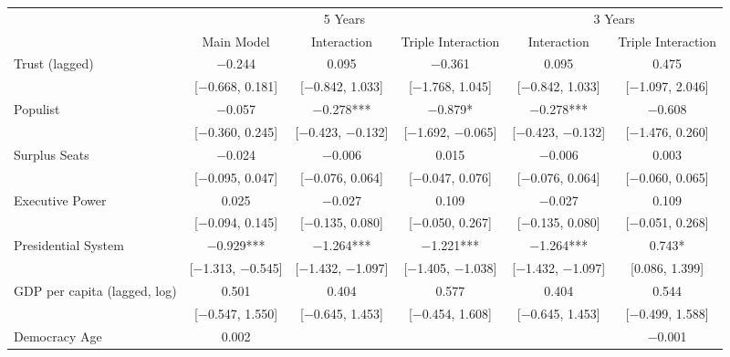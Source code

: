 \begin{table}
\centering\centering\centering
\begin{tabular}[t]{lccccc}
\toprule
\multicolumn{1}{c}{ } & \multicolumn{3}{c}{5 Years} & \multicolumn{2}{c}{3 Years} \\
\cmidrule(l{3pt}r{3pt}){2-4} \cmidrule(l{3pt}r{3pt}){5-6}
  & Main Model & Interaction & Triple Interaction & Interaction  & Triple Interaction \\
\midrule
Trust (lagged) & \num{-0.244} & \num{0.095} & \num{-0.361} & \num{0.095} & \num{0.475}\\
 & {}[\num{-0.668}, \num{0.181}] & {}[\num{-0.842}, \num{1.033}] & {}[\num{-1.768}, \num{1.045}] & {}[\num{-0.842}, \num{1.033}] & {}[\num{-1.097}, \num{2.046}]\\
Populist & \num{-0.057} & \num{-0.278}*** & \num{-0.879}* & \num{-0.278}*** & \num{-0.608}\\
 & {}[\num{-0.360}, \num{0.245}] & {}[\num{-0.423}, \num{-0.132}] & {}[\num{-1.692}, \num{-0.065}] & {}[\num{-0.423}, \num{-0.132}] & {}[\num{-1.476}, \num{0.260}]\\
Surplus Seats & \num{-0.024} & \num{-0.006} & \num{0.015} & \num{-0.006} & \num{0.003}\\
 & {}[\num{-0.095}, \num{0.047}] & {}[\num{-0.076}, \num{0.064}] & {}[\num{-0.047}, \num{0.076}] & {}[\num{-0.076}, \num{0.064}] & {}[\num{-0.060}, \num{0.065}]\\
Executive Power & \num{0.025} & \num{-0.027} & \num{0.109} & \num{-0.027} & \num{0.109}\\
 & {}[\num{-0.094}, \num{0.145}] & {}[\num{-0.135}, \num{0.080}] & {}[\num{-0.050}, \num{0.267}] & {}[\num{-0.135}, \num{0.080}] & {}[\num{-0.051}, \num{0.268}]\\
Presidential System & \num{-0.929}*** & \num{-1.264}*** & \num{-1.221}*** & \num{-1.264}*** & \num{0.743}*\\
 & {}[\num{-1.313}, \num{-0.545}] & {}[\num{-1.432}, \num{-1.097}] & {}[\num{-1.405}, \num{-1.038}] & {}[\num{-1.432}, \num{-1.097}] & {}[\num{0.086}, \num{1.399}]\\
GDP per capita (lagged, log) & \num{0.501} & \num{0.404} & \num{0.577} & \num{0.404} & \num{0.544}\\
 & {}[\num{-0.547}, \num{1.550}] & {}[\num{-0.645}, \num{1.453}] & {}[\num{-0.454}, \num{1.608}] & {}[\num{-0.645}, \num{1.453}] & {}[\num{-0.499}, \num{1.588}]\\
Democracy Age & \num{0.002} &  &  &  & \num{-0.001}\\

\end{tabular}
\end{table}
